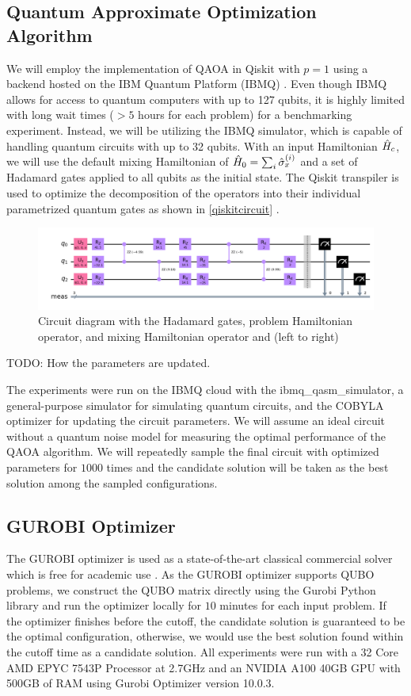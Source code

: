 \subsection{Quantum Approximate Optimization Algorithm}
We will employ the implementation of QAOA in Qiskit with $p=1$ using a backend hosted on the IBM Quantum Platform (IBMQ) \cite{b24}. Even though IBMQ allows for access to quantum computers with up to 127 qubits, it is highly limited with long wait times ($>5$ hours for each problem) for a benchmarking experiment. Instead, we will be utilizing the IBMQ simulator, which is capable of handling quantum circuits with up to 32 qubits. With an input Hamiltonian $\Hat{H}_c$, we will use the default mixing Hamiltonian of $\Hat{H}_0 = \sum_{i}\Hat{\sigma}_x^{(i)}$ and a set of Hadamard gates applied to all qubits as the initial state. The Qiskit transpiler is used to optimize the decomposition of the operators into their individual parametrized quantum gates as shown in \autoref{qiskitcircuit} \cite{qiskittranspiler}.

\begin{figure}[h!]
    \centering
    \includegraphics[width=1\linewidth]{images/qiskit_circuit.png}
    \caption{Circuit diagram with the Hadamard gates, problem Hamiltonian operator, and mixing Hamiltonian operator and  (left to right)}
    \label{qiskitcircuit}
\end{figure}

TODO: How the parameters are updated.

The experiments were run on the IBMQ cloud with the ibmq\_qasm\_simulator, a general-purpose simulator for simulating quantum circuits, and the COBYLA optimizer for updating the circuit parameters. We will assume an ideal circuit without a quantum noise model for measuring the optimal performance of the QAOA algorithm. We will repeatedly sample the final circuit with optimized parameters for $1000$ times and the candidate solution will be taken as the best solution among the sampled configurations.


\subsection{GUROBI Optimizer}
The GUROBI optimizer is used as a state-of-the-art classical commercial solver which is free for academic use \cite{b26}. As the GUROBI optimizer supports QUBO problems, we construct the QUBO matrix directly using the Gurobi Python library and run the optimizer locally for $10$ minutes for each input problem. If the optimizer finishes before the cutoff, the candidate solution is guaranteed to be the optimal configuration, otherwise, we would use the best solution found within the cutoff time as a candidate solution. All experiments were run with a 32 Core AMD EPYC 7543P Processor at 2.7GHz and an NVIDIA A100 40GB GPU with 500GB of RAM using Gurobi Optimizer version 10.0.3.

